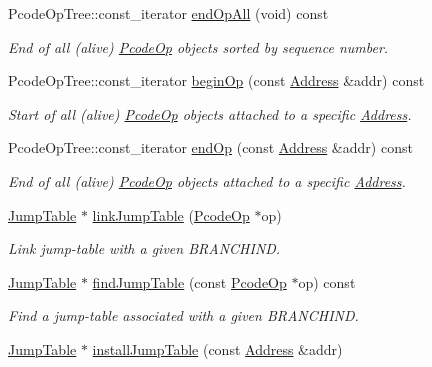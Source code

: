 \begin{DoxyCompactItemize}
Pcode\+Op\+Tree\+::const\+\_\+iterator \mbox{\hyperlink{class_funcdata_a7e51e10ff92ea150cb4fe73d4fdd64dd}{end\+Op\+All}} (void) const
\begin{DoxyCompactList}\small\item\em End of all (alive) \mbox{\hyperlink{class_pcode_op}{Pcode\+Op}} objects sorted by sequence number. \end{DoxyCompactList}\item 
Pcode\+Op\+Tree\+::const\+\_\+iterator \mbox{\hyperlink{class_funcdata_a07dbd8a5ef4e19cd8e8c445cf8e43282}{begin\+Op}} (const \mbox{\hyperlink{class_address}{Address}} \&addr) const
\begin{DoxyCompactList}\small\item\em Start of all (alive) \mbox{\hyperlink{class_pcode_op}{Pcode\+Op}} objects attached to a specific \mbox{\hyperlink{class_address}{Address}}. \end{DoxyCompactList}\item 
Pcode\+Op\+Tree\+::const\+\_\+iterator \mbox{\hyperlink{class_funcdata_abd4ddbda57c4b42954ad64ddfdc0b251}{end\+Op}} (const \mbox{\hyperlink{class_address}{Address}} \&addr) const
\begin{DoxyCompactList}\small\item\em End of all (alive) \mbox{\hyperlink{class_pcode_op}{Pcode\+Op}} objects attached to a specific \mbox{\hyperlink{class_address}{Address}}. \end{DoxyCompactList}\item 
\mbox{\hyperlink{class_jump_table}{Jump\+Table}} $\ast$ \mbox{\hyperlink{class_funcdata_a512f5823b1a33e9430584067d77a52c5}{link\+Jump\+Table}} (\mbox{\hyperlink{class_pcode_op}{Pcode\+Op}} $\ast$op)
\begin{DoxyCompactList}\small\item\em Link jump-\/table with a given B\+R\+A\+N\+C\+H\+I\+ND. \end{DoxyCompactList}\item 
\mbox{\hyperlink{class_jump_table}{Jump\+Table}} $\ast$ \mbox{\hyperlink{class_funcdata_a9a314cd3b9e823c436ac47e356da8a39}{find\+Jump\+Table}} (const \mbox{\hyperlink{class_pcode_op}{Pcode\+Op}} $\ast$op) const
\begin{DoxyCompactList}\small\item\em Find a jump-\/table associated with a given B\+R\+A\+N\+C\+H\+I\+ND. \end{DoxyCompactList}\item 
\mbox{\hyperlink{class_jump_table}{Jump\+Table}} $\ast$ \mbox{\hyperlink{class_funcdata_a337a544e372368eb5c41b1bb5e410932}{install\+Jump\+Table}} (const \mbox{\hyperlink{class_address}{Address}} \&addr)

\end{DoxyCompactItemize}
